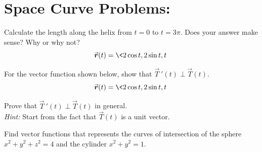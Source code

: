 \section*{Space Curve Problems:}
\begin{list}{\bf{Problem : }}{}
\item Calculate the length along the helix from \(t=0\) to \(t=3\pi\). Does your answer make sense? Why or why not?
\[
\vec{r}(t) = \<2 \cos t, 2\sin t, t\>
\]

\vfill

\item For the vector function shown below, show that \(\vec{T}\ '(t) \perp \vec{T}(t)\).\\

\[
\vec{r}(t) = \<2 \cos t, 2\sin t, t\>
\]

\vfill

\item Prove that  \(\vec{T}\ '(t) \perp \vec{T}(t)\) in general.\\
\textit{Hint:} Start from the fact that \(\vec{T}(t)\) is a unit vector.

\vfill

\item Find vector functions that represents the curves of intersection of the sphere \(x^2 + y^2 + z^2 = 4\) and the cylinder \(x^2+y^2 = 1\).

\vfill


\end{list}
